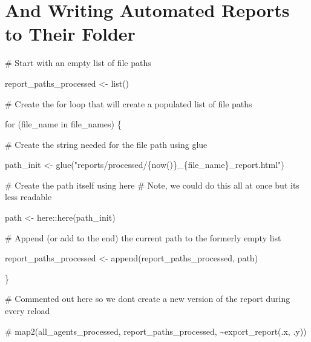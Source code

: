 \documentclass[
  letterpaper,
  DIV=11,
  numbers=noendperiod]{scrreprt}
\newenvironment{Shaded}{\begin{snugshade}}{\end{snugshade}}
\newcommand{\CommentTok}[1]{\textcolor[rgb]{0.37,0.37,0.37}{#1}}
\newcommand{\ControlFlowTok}[1]{\textcolor[rgb]{0.00,0.23,0.31}{#1}}
\newcommand{\FunctionTok}[1]{\textcolor[rgb]{0.28,0.35,0.67}{#1}}
\newcommand{\NormalTok}[1]{\textcolor[rgb]{0.00,0.23,0.31}{#1}}
\newcommand{\OtherTok}[1]{\textcolor[rgb]{0.00,0.23,0.31}{#1}}
\newcommand{\SpecialCharTok}[1]{\textcolor[rgb]{0.37,0.37,0.37}{#1}}
\newcommand{\StringTok}[1]{\textcolor[rgb]{0.13,0.47,0.30}{#1}}
\begin{document}
\hypertarget{and-writing-automated-reports-to-their-folder}{%
\section{And Writing Automated Reports to Their
Folder}\label{and-writing-automated-reports-to-their-folder}}

\begin{Shaded}
\begin{Highlighting}[]
\CommentTok{\# Start with an empty list of file paths}

\NormalTok{report\_paths\_processed }\OtherTok{\textless{}{-}} \FunctionTok{list}\NormalTok{()}

\CommentTok{\# Create the for loop that will create a populated list of file paths}

\ControlFlowTok{for}\NormalTok{ (file\_name }\ControlFlowTok{in}\NormalTok{ file\_names) \{}
  
  \CommentTok{\# Create the string needed for the file path using \textasciigrave{}glue\textasciigrave{}}
  
\NormalTok{  path\_init }\OtherTok{\textless{}{-}} \FunctionTok{glue}\NormalTok{(}\StringTok{"reports/processed/\{now()\}\_\{file\_name\}\_report.html"}\NormalTok{)}
  
  \CommentTok{\# Create the path itself using \textasciigrave{}here\textasciigrave{}}
  \CommentTok{\# Note, we could do this all at once but it\textquotesingle{}s less readable}
  
\NormalTok{  path }\OtherTok{\textless{}{-}}\NormalTok{ here}\SpecialCharTok{::}\FunctionTok{here}\NormalTok{(path\_init)}
  
  \CommentTok{\# Append (or add to the end) the current path to the formerly empty list}
  
\NormalTok{  report\_paths\_processed }\OtherTok{\textless{}{-}} \FunctionTok{append}\NormalTok{(report\_paths\_processed, path)}
  
\NormalTok{\}}
\end{Highlighting}
\end{Shaded}

\begin{Shaded}
\begin{Highlighting}[]
\CommentTok{\# Commented out here so we don\textquotesingle{}t create a new version of the report during every reload}

\CommentTok{\# map2(all\_agents\_processed, report\_paths\_processed, \textasciitilde{}export\_report(.x, .y))}
\end{Highlighting}
\end{Shaded}
\end{document}
